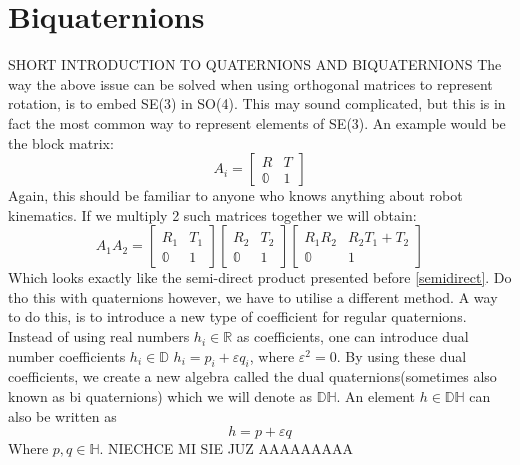\section{Biquaternions}
SHORT INTRODUCTION TO QUATERNIONS AND BIQUATERNIONS
The way the above issue can be solved when using orthogonal matrices to represent rotation, is to embed SE(3) in SO(4). This may sound complicated, but this is in fact the most common way to represent elements of SE(3). An example would be the block matrix:
\begin{equation}
    A_i = \begin{bmatrix}
        R & T   \\
        \mathbb{0} & 1
    \end{bmatrix}
\end{equation}
Again, this should be familiar to anyone who knows anything about robot kinematics. If we multiply 2 such matrices together we will obtain:
\begin{equation}
    A_1A_2 =  \begin{bmatrix}
        R_1 & T_1   \\
        \mathbb{0} & 1
    \end{bmatrix} 
 \begin{bmatrix}
        R_2 & T_2   \\
        \mathbb{0} & 1
    \end{bmatrix} 
 \begin{bmatrix}
        R_1R_2 & R_2T_1 + T_2\\
        \mathbb{0} & 1
    \end{bmatrix}
\end{equation}
Which looks exactly like the semi-direct product presented before \ref{semidirect}. Do tho this with quaternions however, we have to utilise a different method. A way to do this, is to introduce a new type of coefficient for 
regular quaternions. Instead of using real numbers $h_i \in \mathbb{R}$ as coefficients, one can introduce dual number coefficients $h_i \in \mathbb{D}$ $h_i = p_i + \varepsilon q_i$, where  $\varepsilon^{2} = 0$. By using these dual coefficients, we create a new algebra called the dual quaternions(sometimes also known as bi quaternions) which we will denote as $\mathbb{DH}$. An element $h \in \mathbb{DH}$ can also be written as 
 \begin{equation}
    h = p + \varepsilon q
\end{equation}
Where $p,q \in \mathbb{H}$. 
NIECHCE MI SIE JUZ AAAAAAAAA
